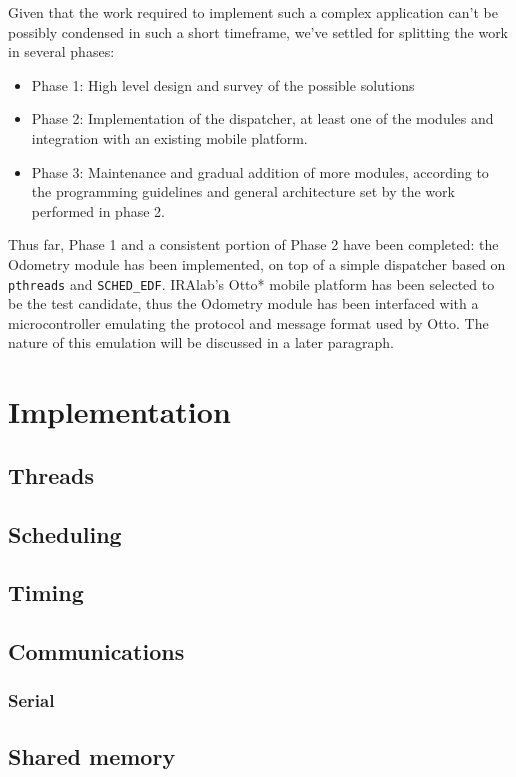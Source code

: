 \documentclass[a4paper,12pt]{report}
\begin{document}
Given that the work required to implement such a complex application can't be possibly condensed in such a short timeframe, we've settled for splitting the work in several phases:
\begin{itemize}
\item Phase 1: High level design and survey of the possible solutions
\item Phase 2: Implementation of the dispatcher, at least one of the
  modules and integration with an existing mobile platform. 
\item Phase 3: Maintenance and gradual addition of more modules,
  according to the programming guidelines and general architecture set
  by the work performed in phase 2. 
\end{itemize}

Thus far, Phase 1 and a consistent portion of Phase 2 have been completed: the Odometry module has been implemented, on top of a simple dispatcher based on \texttt{pthreads} and \texttt{SCHED\_EDF}. IRAlab's Otto* mobile platform has been selected to be the test candidate, thus the Odometry module has been interfaced with a microcontroller emulating the protocol and message format used by Otto. The nature of this emulation will be discussed in a later paragraph. %

\section{Implementation}
\subsection{Threads}
\subsection{Scheduling}
\subsection{Timing}
\subsection{Communications}
\subsubsection{Serial}
\subsection{Shared memory}
\end{document}
